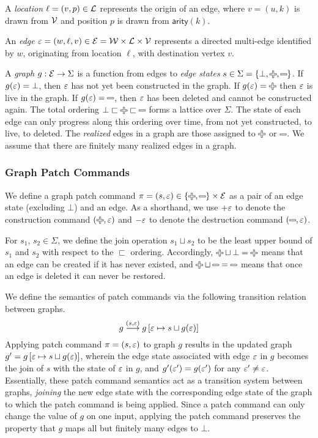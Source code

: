 A \emph{location} $\ell = (v, p) \in \mathcal{L}$ represents the origin of an edge, where $v=(u,k)$ is drawn from $\mathcal{V}$ and position $p$ is drawn from $\mathsf{arity}(k)$.

An \emph{edge} $\varepsilon = (w, \ell, v) \in \mathcal{E} = \mathcal{W} \times \mathcal{L} \times \mathcal{V}$ represents a directed multi-edge 
    identified by $w$, 
    originating from location $\ell$, 
    with destination vertex $v$.

A \emph{graph} $g : \mathcal{E} \rightarrow \Sigma$ is a function from edges to \emph{edge states} $s \in \Sigma = \SetOf{\bot, \Plus, \Minus}$. If $g(\varepsilon) = \bot$, then $\varepsilon$ has not yet been constructed in the graph. If $g(\e) = \Plus$ then $\varepsilon$ is live in the graph. If $g(\e) = \Minus$, then $\varepsilon$ has been deleted and cannot be constructed again. The total ordering $\bot \sqsubset \Plus \sqsubset \Minus$ forms a lattice over $\Sigma$. The state of each edge can only progress along this ordering over time, from not yet constructed, to live, to deleted. The \textit{realized} edges in a graph are those assigned to $\Plus$ or $\Minus$. We assume that there are finitely many realized edges in a graph. 

\subsubsection{Graph Patch Commands}
\label{subsub:Graph Patches}

We define a graph patch command $\pi = (s,\e) \in \left\{\Plus, \Minus\right\} \times \E$
as a pair of an edge state (excluding $\bot$) and an edge. As a shorthand, we use $+\varepsilon$ to denote the construction command $(\Plus, \e)$ and $-\varepsilon$ to denote the destruction command $(\Minus, \e)$.

For $s_1$, $s_2 \in \Sigma$, we define the join operation $s_1 \sqcup s_2$ to be the least upper bound of $s_1$ and $s_2$ with respect to the $\sqsubset$ ordering. Accordingly, $\Plus \sqcup \bot = \Plus$ means that an edge can be created if it has never existed, and $\Plus \sqcup \Minus = \Minus$ means that once an edge is deleted it can never be restored.

We define the semantics of patch commands via the following transition relation
between graphs.
\[
  g \overset{(s,\varepsilon)}{\longrightarrow} g\left[ \varepsilon \mapsto s \sqcup g(\varepsilon) \right]
\]
Applying patch command $\pi = \left(s, \varepsilon\right)$ to graph $g$ results in the updated graph $g' = g\left[\varepsilon \mapsto s \sqcup g(\varepsilon) \right]$, wherein the edge
state associated with edge $\varepsilon$ in $g$ becomes the join of $s$ with the state of $\varepsilon$ in $g$, and $g'(\varepsilon') = g(\varepsilon')$ for any $\varepsilon' \ne \varepsilon$. Essentially, these patch command semantics act as a transition system between graphs, \emph{joining} the new edge state with the corresponding edge state of the graph to which the patch command is being applied. Since a patch command can only change the value of $g$ on one input, applying the patch command preserves the property that $g$ maps all but finitely many edges to $\bot$.  

